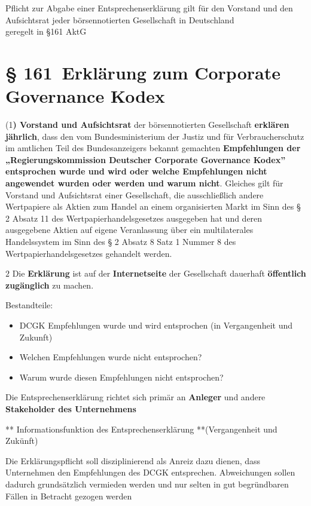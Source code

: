 \documentclass[
]{article}
\providecommand{\tightlist}{%
  \setlength{\itemsep}{0pt}\setlength{\parskip}{0pt}}
\begin{document}
Pflicht zur Abgabe einer Entsprechenserklärung gilt für den Vorstand und
den Aufsichtsrat jeder börsennotierten Gesellschaft in Deutschland\\
geregelt in §161 AktG

\hypertarget{erkluxe4rung-zum-corporate-governance-kodex}{%
\section{§ 161~Erklärung zum Corporate Governance
Kodex}\label{erkluxe4rung-zum-corporate-governance-kodex}}

(1\textbf{) Vorstand und Aufsichtsrat} der börsennotierten Gesellschaft
\textbf{erklären jährlich}, dass den vom Bundesministerium der Justiz
und für Verbraucherschutz im amtlichen Teil des Bundesanzeigers bekannt
gemachten \textbf{Empfehlungen der „Regierungskommission Deutscher
Corporate Governance Kodex'' entsprochen wurde und wird oder welche
Empfehlungen nicht angewendet wurden oder werden und warum nicht}.
Gleiches gilt für Vorstand und Aufsichtsrat einer Gesellschaft, die
ausschließlich andere Wertpapiere als Aktien zum Handel an einem
organisierten Markt im Sinn des § 2 Absatz 11 des
Wertpapierhandelsgesetzes ausgegeben hat und deren ausgegebene Aktien
auf eigene Veranlassung über ein multilaterales Handelssystem im Sinn
des § 2 Absatz 8 Satz 1 Nummer 8 des Wertpapierhandelsgesetzes gehandelt
werden.

\(2\) Die \textbf{Erklärung} ist auf der \textbf{Internetseite} der
Gesellschaft dauerhaft \textbf{öffentlich zugänglich} zu machen.

Bestandteile:

\begin{itemize}
\tightlist
\item
  DCGK Empfehlungen wurde und wird entsprochen (in Vergangenheit und
  Zukunft)
\item
  Welchen Empfehlungen wurde nicht entsprochen?
\item
  Warum wurde diesen Empfehlungen nicht entsprochen?
\end{itemize}

Die Entsprechenserklärung richtet sich primär an \textbf{Anleger} und
andere \textbf{Stakeholder des Unternehmens}

** Informationsfunktion des Entsprechenserklärung **(Vergangenheit und
Zukünft)

Die Erklärungspflicht soll disziplinierend als Anreiz dazu dienen, dass
Unternehmen den Empfehlungen des DCGK entsprechen. Abweichungen sollen
dadurch grundsätzlich vermieden werden und nur selten in gut
begründbaren Fällen in Betracht gezogen werden
\end{document}
